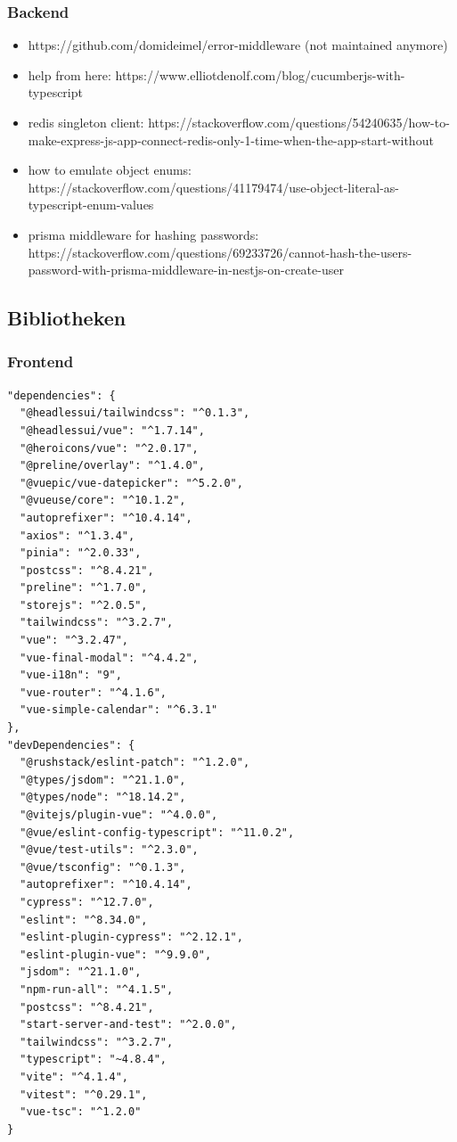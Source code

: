 \documentclass[a4paper, 12pt]{article}
\begin{document}
    \subsubsection{Backend}

\begin{itemize}
  \item https://github.com/domideimel/error-middleware  (not maintained anymore)
  \item help from here: https://www.elliotdenolf.com/blog/cucumberjs-with-typescript
  \item redis singleton client: https://stackoverflow.com/questions/54240635/how-to-make-express-js-app-connect-redis-only-1-time-when-the-app-start-without
  \item how to emulate object enums: https://stackoverflow.com/questions/41179474/use-object-literal-as-typescript-enum-values
  \item prisma middleware for hashing passwords: https://stackoverflow.com/questions/69233726/cannot-hash-the-users-password-with-prisma-middleware-in-nestjs-on-create-user
\end{itemize}

    \newpage
    \subsection{Bibliotheken}
    \subsubsection{Frontend}

    \begin{verbatim}
"dependencies": {
  "@headlessui/tailwindcss": "^0.1.3",
  "@headlessui/vue": "^1.7.14",
  "@heroicons/vue": "^2.0.17",
  "@preline/overlay": "^1.4.0",
  "@vuepic/vue-datepicker": "^5.2.0",
  "@vueuse/core": "^10.1.2",
  "autoprefixer": "^10.4.14",
  "axios": "^1.3.4",
  "pinia": "^2.0.33",
  "postcss": "^8.4.21",
  "preline": "^1.7.0",
  "storejs": "^2.0.5",
  "tailwindcss": "^3.2.7",
  "vue": "^3.2.47",
  "vue-final-modal": "^4.4.2",
  "vue-i18n": "9",
  "vue-router": "^4.1.6",
  "vue-simple-calendar": "^6.3.1"
},
"devDependencies": {
  "@rushstack/eslint-patch": "^1.2.0",
  "@types/jsdom": "^21.1.0",
  "@types/node": "^18.14.2",
  "@vitejs/plugin-vue": "^4.0.0",
  "@vue/eslint-config-typescript": "^11.0.2",
  "@vue/test-utils": "^2.3.0",
  "@vue/tsconfig": "^0.1.3",
  "autoprefixer": "^10.4.14",
  "cypress": "^12.7.0",
  "eslint": "^8.34.0",
  "eslint-plugin-cypress": "^2.12.1",
  "eslint-plugin-vue": "^9.9.0",
  "jsdom": "^21.1.0",
  "npm-run-all": "^4.1.5",
  "postcss": "^8.4.21",
  "start-server-and-test": "^2.0.0",
  "tailwindcss": "^3.2.7",
  "typescript": "~4.8.4",
  "vite": "^4.1.4",
  "vitest": "^0.29.1",
  "vue-tsc": "^1.2.0"
}
    \end{verbatim}
\end{document}
